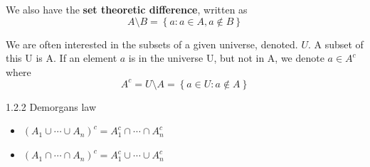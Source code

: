 \documentclass[a4paper,norsk]{article}
\begin{document}
We also have the \textbf{set theoretic difference}, written as 
\[
     A \setminus B = \left\{ a : a \in A, a \notin B  \right\} 
\]

We are often interested in the subsets of a given universe, denoted.  $ U $. A subset of this U is A. If an element $ a $  is in the universe U, but not in A, we denote $ a \in A^c $ where 
\[
    A^c  = U \setminus A = \left\{ a \in U : a \notin A \right\} 
\]


\begin{propositionbox}{1.2.2 Demorgans law}{}
  \begin{itemize}
    \item $ \left( A_1 \cup \cdots \cup A_n \right) ^ c = A_1^c \cap \cdots \cap A_n^c $
    \item $ \left( A_1 \cap \cdots \cap A_n \right) ^ c = A_1^c \cup \cdots \cup A_n^c $  
  \end{itemize}
\end{propositionbox}
\end{document}
